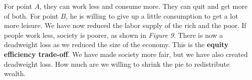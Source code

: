 \documentclass{article}
\begin{document}
For point $A$, they can work less and consume more. They can quit and get more
of both. For point $B$, he is willing to give up a little consumption to get a
lot more leisure. We have now reduced the labor supply of the rich and the poor.
If people work less, society is poorer, as shown in \textit{Figure 9}. There is
now a deadweight loss as we reduced the size of the economy. This is the
\textbf{equity efficiency trade-off}. We have made society more fair, but we
have also created deadweight loss. How much are we willing to shrink the pie to
redistribute wealth.
\end{document}
